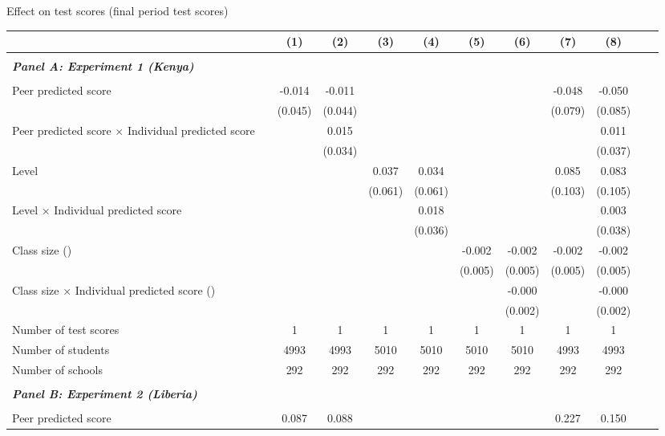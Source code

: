 \begin{center} 
\caption{\small Effect on test scores (final period test scores)} 
\label{tab:descriptives} 
\begin{scriptsize}
\begin{threeparttable}
\begin{tabular} {@{} l l c c c c c c c c c c  @{}} \toprule \toprule
& &(1)&(2)&(3)&(4)&(5)&(6)&(7)&(8) \\ \midrule 
\\
\multicolumn{3}{l}{\textbf{\textit{Panel A: Experiment 1 (Kenya)}}} \\
\\
Peer predicted score &  & -0.014 & -0.011 &  &  &  &  & -0.048 & -0.050 \\
                 &  & (0.045) & (0.044) &  &  &  &  & (0.079) & (0.085) \\
Peer predicted score $\times$ Individual predicted score &  &  & 0.015 &  &  &  &  &  & 0.011 \\
                 &  &  & (0.034) &  &  &  &  &  & (0.037) \\
Level &  &  &  & 0.037 & 0.034 &  &  & 0.085 & 0.083 \\
                 &  &  &  & (0.061) & (0.061) &  &  & (0.103) & (0.105) \\
Level $\times$ Individual predicted score &  &  &  &  & 0.018 &  &  &  & 0.003 \\
                 &  &  &  &  & (0.036) &  &  &  & (0.038) \\
Class size (\times 10) &  &  &  &  &  & -0.002 & -0.002 & -0.002 & -0.002 \\
                 &  &  &  &  &  & (0.005) & (0.005) & (0.005) & (0.005) \\
Class size $\times$ Individual predicted score (\times 10) &  &  &  &  &  &  & -0.000 &  & -0.000 \\
                 &  &  &  &  &  &  & (0.002) &  & (0.002) \\
\midrule
Number of test scores &  & 1 & 1 & 1 & 1 & 1 & 1 & 1 & 1 \\
Number of students &  & 4993 & 4993 & 5010 & 5010 & 5010 & 5010 & 4993 & 4993 \\
Number of schools &  & 292 & 292 & 292 & 292 & 292 & 292 & 292 & 292 \\
 \midrule
\\
\multicolumn{3}{l}{\textbf{\textit{Panel B: Experiment 2 (Liberia)}}} \\
\\
Peer predicted score &  & 0.087 & 0.088 &  &  &  &  & 0.227 & 0.150 \\

\end{tabular}
\end{threeparttable}
\end{scriptsize}
\end{center}
